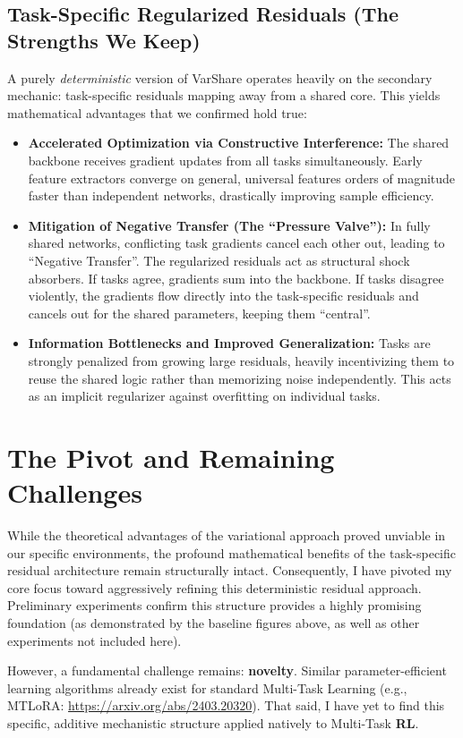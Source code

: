 \documentclass[11pt,a4paper]{article}
\begin{document}
\subsection*{Task-Specific Regularized Residuals (The Strengths We Keep)}
A purely \textit{deterministic} version of VarShare operates heavily on the secondary mechanic: task-specific residuals mapping away from a shared core. This yields mathematical advantages that we confirmed hold true:
\begin{itemize}
    \item \textbf{Accelerated Optimization via Constructive Interference:} The shared backbone receives gradient updates from all tasks simultaneously. Early feature extractors converge on general, universal features orders of magnitude faster than independent networks, drastically improving sample efficiency.
    \item \textbf{Mitigation of Negative Transfer (The ``Pressure Valve''):} In fully shared networks, conflicting task gradients cancel each other out, leading to ``Negative Transfer''. The regularized residuals act as structural shock absorbers. If tasks agree, gradients sum into the backbone. If tasks disagree violently, the gradients flow directly into the task-specific residuals and cancels out for the shared parameters, keeping them ``central''.
    \item \textbf{Information Bottlenecks and Improved Generalization:} Tasks are strongly penalized from growing large residuals, heavily incentivizing them to reuse the shared logic rather than memorizing noise independently. This acts as an implicit regularizer against overfitting on individual tasks.
\end{itemize}

\section*{The Pivot and Remaining Challenges}

While the theoretical advantages of the variational approach proved unviable in our specific environments, the profound mathematical benefits of the task-specific residual architecture remain structurally intact. Consequently, I have pivoted my core focus toward aggressively refining this deterministic residual approach. Preliminary experiments confirm this structure provides a highly promising foundation (as demonstrated by the baseline figures above, as well as other experiments not included here).

However, a fundamental challenge remains: \textbf{novelty}. 
Similar parameter-efficient learning algorithms already exist for standard Multi-Task Learning (e.g., MTLoRA: \url{https://arxiv.org/abs/2403.20320}). That said, I have yet to find this specific, additive mechanistic structure applied natively to Multi-Task \textbf{RL}. 
\end{document}
